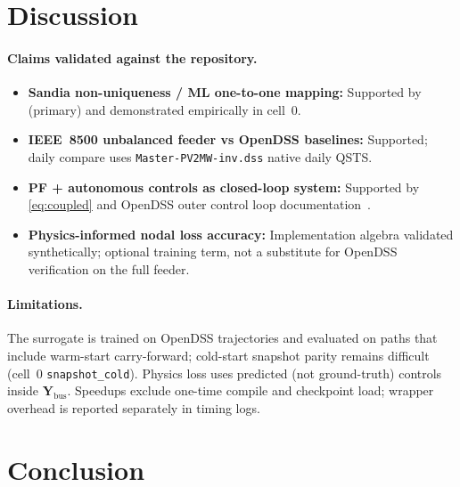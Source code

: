 \documentclass[11pt,a4paper]{article}
\begin{document}
\section{Discussion}
\label{sec:discussion}

\paragraph{Claims validated against the repository.}
\begin{itemize}
  \item \textbf{Sandia non-uniqueness / ML one-to-one mapping:} Supported by
        \cite{deboever2017qsts} (primary) and demonstrated empirically in cell~0.
  \item \textbf{IEEE~8500 unbalanced feeder vs OpenDSS baselines:} Supported;
        daily compare uses \texttt{Master-PV2MW-inv.dss} native daily QSTS.
  \item \textbf{PF + autonomous controls as closed-loop system:} Supported by
        \eqref{eq:coupled} and OpenDSS outer control loop
        documentation~\cite{gnn2_ieee8500_avc,opendss}.
  \item \textbf{Physics-informed nodal loss accuracy:} Implementation algebra
        validated synthetically; optional training term, not a substitute for
        OpenDSS verification on the full feeder.
\end{itemize}

\paragraph{Limitations.}
The surrogate is trained on OpenDSS trajectories and evaluated on paths that
include warm-start carry-forward; cold-start snapshot parity remains difficult
(cell~0 \texttt{snapshot\_cold}).  Physics loss uses predicted (not ground-truth)
controls inside $\mathbf{Y}_{\mathrm{bus}}$.  Speedups exclude one-time compile
and checkpoint load; wrapper overhead is reported separately in timing logs.

\section{Conclusion}
\label{sec:conclusion}
\end{document}

